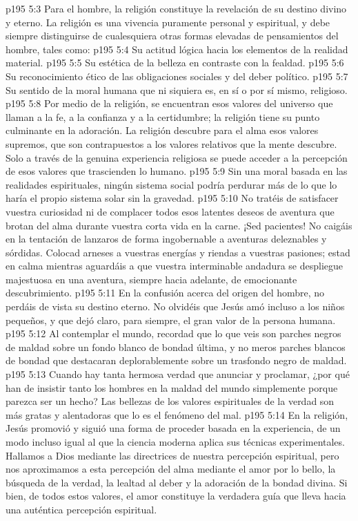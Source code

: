 \vs p195 5:3 Para el hombre, la religión constituye la revelación de su destino divino y eterno. La religión es una vivencia puramente personal y espiritual, y debe siempre distinguirse de cualesquiera otras formas elevadas de pensamientos del hombre, tales como:
\vs p195 5:4 Su actitud lógica hacia los elementos de la realidad material.
\vs p195 5:5 Su estética de la belleza en contraste con la fealdad.
\vs p195 5:6 Su reconocimiento ético de las obligaciones sociales y del deber político.
\vs p195 5:7 Su sentido de la moral humana que ni siquiera es, en sí o por sí mismo, religioso.
\vs p195 5:8 \pc Por medio de la religión, se encuentran esos valores del universo que llaman a la fe, a la confianza y a la certidumbre; la religión tiene su punto culminante en la adoración. La religión descubre para el alma esos valores supremos, que son contrapuestos a los valores relativos que la mente descubre. Solo a través de la genuina experiencia religiosa se puede acceder a la percepción de esos valores que trascienden lo humano.
\vs p195 5:9 Sin una moral basada en las realidades espirituales, ningún sistema social podría perdurar más de lo que lo haría el propio sistema solar sin la gravedad.
\vs p195 5:10 No tratéis de satisfacer vuestra curiosidad ni de complacer todos esos latentes deseos de aventura que brotan del alma durante vuestra corta vida en la carne. ¡Sed pacientes! No caigáis en la tentación de lanzaros de forma ingobernable a aventuras deleznables y sórdidas. Colocad arneses a vuestras energías y riendas a vuestras pasiones; estad en calma mientras aguardáis a que vuestra interminable andadura se despliegue majestuosa en una aventura, siempre hacia adelante, de emocionante descubrimiento.
\vs p195 5:11 \pc En la confusión acerca del origen del hombre, no perdáis de vista su destino eterno. No olvidéis que Jesús amó incluso a los niños pequeños, y que dejó claro, para siempre, el gran valor de la persona humana.
\vs p195 5:12 \pc Al contemplar el mundo, recordad que lo que veis son parches negros de maldad sobre un fondo blanco de bondad última, y no meros parches blancos de bondad que destacaran deplorablemente sobre un trasfondo negro de maldad.
\vs p195 5:13 Cuando hay tanta hermosa verdad que anunciar y proclamar, ¿por qué han de insistir tanto los hombres en la maldad del mundo simplemente porque parezca ser un hecho? Las bellezas de los valores espirituales de la verdad son más gratas y alentadoras que lo es el fenómeno del mal.
\vs p195 5:14 \pc En la religión, Jesús promovió y siguió una forma de proceder basada en la experiencia, de un modo incluso igual al que la ciencia moderna aplica sus técnicas experimentales. Hallamos a Dios mediante las directrices de nuestra percepción espiritual, pero nos aproximamos a esta percepción del alma mediante el amor por lo bello, la búsqueda de la verdad, la lealtad al deber y la adoración de la bondad divina. Si bien, de todos estos valores, el amor constituye la verdadera guía que lleva hacia una auténtica percepción espiritual.
